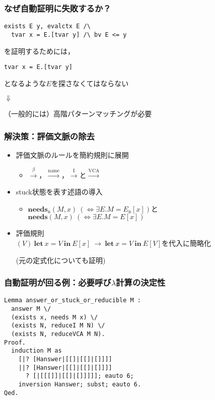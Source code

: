 \documentclass[dvipdfmx,cjk,xcolor=dvipsnames,envcountsect,notheorems,12pt]{beamer}
\theoremstyle{definition}
\newcommand{\LET}[3]{\mathbf{let}~#1=#2~\mathbf{in}~#3}
\newcommand{\FULLBETA}{\xrightarrow{\beta}}
\newcommand{\CALLBYNEEDI}{\xrightarrow{\mathrm{I}}}
\newcommand{\CALLBYNEEDVCA}{\xrightarrow{\mathrm{VCA}}}
\newcommand{\CALLBYNAME}{\xrightarrow{\mathrm{name}}}
\newcommand{\DEMAND}[2]{\mathbf{needs}(#2, #1)}
\newcommand{\STUCK}[2]{\mathbf{needs}_\mathrm{n}(#2, #1)}
\begin{document}
\begin{frame}[fragile]
	\frametitle{なぜ自動証明に失敗するか？}
\Large
\begin{lstlisting}
exists E y, evalctx E /\
  tvar x = E.[tvar y] /\ bv E <= y
\end{lstlisting}
	を証明するためには，
\begin{lstlisting}
tvar x = E.[tvar y]
\end{lstlisting}
	となるような$E$を探さなくてはならない
	\vfill
	\begin{center}$\Downarrow$\end{center} %
\vfill
	\begin{center}
		（一般的には）高階パターンマッチングが必要
	\end{center}
\end{frame}

\begin{frame}
	\frametitle{解決策：評価文脈の除去}
	\begin{itemize}
		\item 評価文脈のルールを簡約規則に展開
			\begin{itemize}
				\item $\FULLBETA$，$\CALLBYNAME$，$\CALLBYNEEDI$と$\CALLBYNEEDVCA$
			\end{itemize}
		\item stuck状態を表す述語の導入
			\begin{itemize}
				\item $\STUCK{x}{M}~(\iff \exists E. M=E_\mathrm{n}[x])$と$\DEMAND{x}{M}~(\iff \exists E. M=E[x])$
			\end{itemize}
		\item 評価規則\\$(V)~{\LET{x}{V}{E[x]}}~\rightarrow~{\LET{x}{V}{E[V]}}$を代入に簡略化\\
		\begin{flushright}
			(元の定式化についても証明)
		\end{flushright}
	\end{itemize}
\end{frame}

\begin{frame}[fragile]
	\frametitle{自動証明が回る例：必要呼び$\lambda$計算の決定性}
\begin{lstlisting}
Lemma answer_or_stuck_or_reducible M :
  answer M \/
  (exists x, needs M x) \/
  (exists N, reduceI M N) \/
  (exists N, reduceVCA M N).
Proof.
  induction M as
    [|? [Hanswer|[[]|[[]|[]]]]
    ||? [Hanswer|[[]|[[]|[]]]]
      ? [|[[[]]|[[]|[]]]]]; eauto 6;
    inversion Hanswer; subst; eauto 6.
Qed.
\end{lstlisting}
\end{frame}
\end{document}

